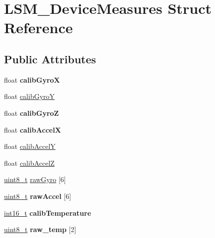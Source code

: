 \hypertarget{structLSM__DeviceMeasures}{}\section{L\+S\+M\+\_\+\+Device\+Measures Struct Reference}
\label{structLSM__DeviceMeasures}
\subsection*{Public Attributes}
\begin{DoxyCompactItemize}
\item 
\mbox{\label{structLSM__DeviceMeasures_a4aaea68e518de41265b0a85f919125de}} 
float {\bfseries calib\+GyroX}
\item 
float \hyperlink{structLSM__DeviceMeasures_a753796d24588a492de078e9257f7ca87}{calib\+GyroY}
\item 
\mbox{\label{structLSM__DeviceMeasures_ac810ee16f2786fb40643d93b8a143057}} 
float {\bfseries calib\+GyroZ}
\item 
\mbox{\label{structLSM__DeviceMeasures_a5cb3994dfd5b1c87bab20d79c695fea7}} 
float {\bfseries calib\+AccelX}
\item 
float \hyperlink{structLSM__DeviceMeasures_adcb5c49a650699c662f77f0b49b59a53}{calib\+AccelY}
\item 
float \hyperlink{structLSM__DeviceMeasures_a0d557711f5cae6f4216a394c4a2b2abd}{calib\+AccelZ}
\item 
\hyperlink{vl53l0x__types_8h_aba7bc1797add20fe3efdf37ced1182c5}{uint8\+\_\+t} \hyperlink{structLSM__DeviceMeasures_a9922b2bcf5d5a667712d6391757fb7d7}{raw\+Gyro} \mbox{[}6\mbox{]}
\item 
\mbox{\label{structLSM__DeviceMeasures_a1d75674132b0a82a65f430a66b557f0b}} 
\hyperlink{vl53l0x__types_8h_aba7bc1797add20fe3efdf37ced1182c5}{uint8\+\_\+t} {\bfseries raw\+Accel} \mbox{[}6\mbox{]}
\item 
\mbox{\label{structLSM__DeviceMeasures_a7f02eddcdc48c2c362872e3b70e0a84a}} 
\hyperlink{vl53l0x__types_8h_aa343fa3b3d06292b959ffdd4c4703b06}{int16\+\_\+t} {\bfseries calib\+Temperature}
\item 
\mbox{\label{structLSM__DeviceMeasures_a1a447dae80ad8d078657fc2d064dd942}} 
\hyperlink{vl53l0x__types_8h_aba7bc1797add20fe3efdf37ced1182c5}{uint8\+\_\+t} {\bfseries raw\+\_\+temp} \mbox{[}2\mbox{]}
\end{DoxyCompactItemize}


